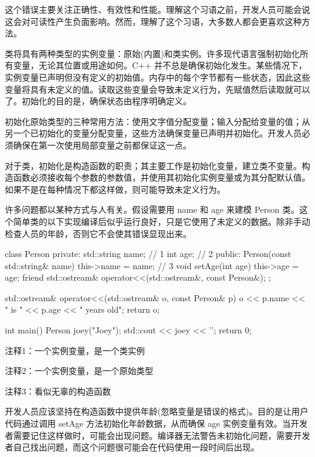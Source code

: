 这个错误主要关注正确性、有效性和性能。理解这个习语之前，开发人员可能会说这会对可读性产生负面影响。然而，理解了这个习语，大多数人都会更喜欢这种方法。

类将具有两种类型的实例变量：原始(内置)和类实例。许多现代语言强制初始化所有变量，无论其位置或用途如何。C++ 并不总是确保初始化发生。某些情况下，实例变量已声明但没有定义的初始值。内存中的每个字节都有一些状态，因此这些变量将具有未定义的值。读取这些变量会导致未定义行为，先赋值然后读取就可以了。初始化的目的是，确保状态由程序明确定义。

初始化原始类型的三种常用方法：使用文字值分配变量；输入分配给变量的值；从另一个已初始化的变量分配变量，这些方法确保变量已声明并初始化。开发人员必须确保在第一次使用局部变量之前都保证这一点。

对于类，初始化是构造函数的职责；其主要工作是初始化变量，建立类不变量。构造函数必须接收每个参数的参数值，并使用其初始化实例变量或为其分配默认值。如果不是在每种情况下都这样做，则可能导致未定义行为。


许多问题都以某种方式与人有关。假设需要用 name 和 age 来建模 Person 类。这个简单类的以下实现编译后似乎运行良好，只是它使用了未定义的数据。除非手动检查人员的年龄，否则它不会使其错误显现出来。


\begin{cpp}
class Person {
private:
  std::string name; // 1
  int age; // 2
public:
  Person(const std::string& name) { this->name = name; } // 3
  void setAge(int age) { this->age = age; }
  friend std::ostream& operator<<(std::ostream&, const Person&);
};

std::ostream& operator<<(std::ostream& o, const Person& p) {
  o << p.name << " is " << p.age << " years old";
  return o;
}

int main() {
  Person joey("Joey");
  std::cout << joey << '\n';
  return 0;
}
\end{cpp}

{\footnotesize
注释1：一个实例变量，是一个类实例

注释2：一个实例变量，是一个原始类型

注释3：看似无辜的构造函数
}

开发人员应该坚持在构造函数中提供年龄(忽略变量是错误的格式)。目的是让用户代码通过调用 setAge 方法初始化年龄数据，从而确保 age 实例变量有效。当开发者需要记住这样做时，可能会出现问题。编译器无法警告未初始化问题，需要开发者自己找出问题，而这个问题很可能会在代码使用一段时间后出现。

